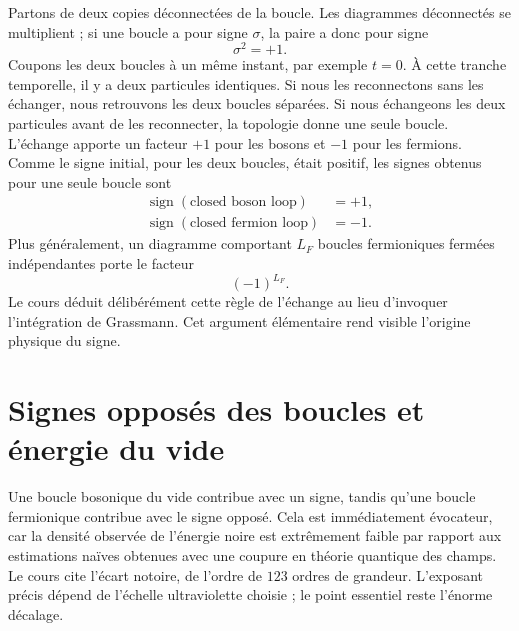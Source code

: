 Partons de deux copies déconnectées de la boucle. Les diagrammes déconnectés se multiplient ; si une boucle a pour signe \(\sigma\), la paire a donc pour signe
\begin{equation}
\sigma^2=+1.
\end{equation}
Coupons les deux boucles à un même instant, par exemple \(t=0\). À cette tranche temporelle, il y a deux particules identiques. Si nous les reconnectons sans les échanger, nous retrouvons les deux boucles séparées. Si nous échangeons les deux particules avant de les reconnecter, la topologie donne une seule boucle. L’échange apporte un facteur \(+1\) pour les bosons et \(-1\) pour les fermions. Comme le signe initial, pour les deux boucles, était positif, les signes obtenus pour une seule boucle sont
\begin{equation}
\begin{aligned}
\operatorname{sign}(\text{closed boson loop})&=+1,\\
\operatorname{sign}(\text{closed fermion loop})&=-1.
\end{aligned}
\end{equation}
Plus généralement, un diagramme comportant \(L_F\) boucles fermioniques fermées indépendantes porte le facteur
\begin{equation}
(-1)^{L_F}.
\end{equation}
Le cours déduit délibérément cette règle de l’échange au lieu d’invoquer l’intégration de Grassmann. Cet argument élémentaire rend visible l’origine physique du signe.

\section{Signes opposés des boucles et énergie du vide}

Une boucle bosonique du vide contribue avec un signe, tandis qu’une boucle fermionique contribue avec le signe opposé. Cela est immédiatement évocateur, car la densité observée de l’énergie noire est extrêmement faible par rapport aux estimations naïves obtenues avec une coupure en théorie quantique des champs. Le cours cite l’écart notoire, de l’ordre de \(123\) ordres de grandeur. L’exposant précis dépend de l’échelle ultraviolette choisie ; le point essentiel reste l’énorme décalage.

